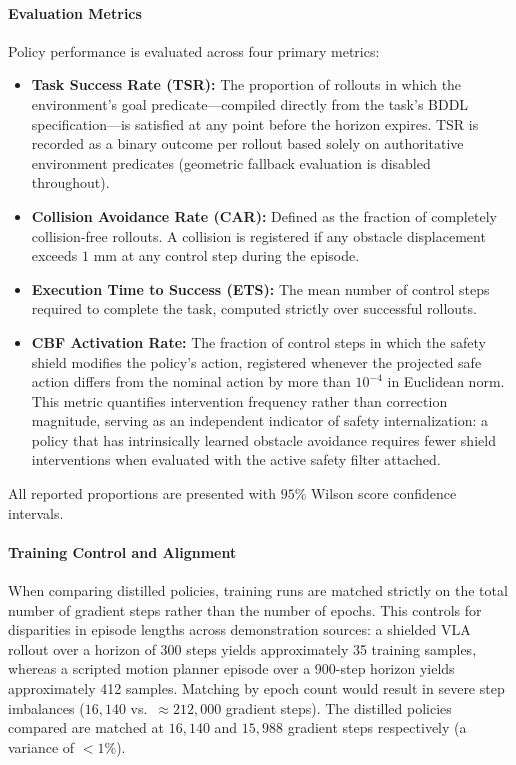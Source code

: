 \documentclass[a4paper,11pt]{report}
\begin{document}
\paragraph{Evaluation Metrics}
Policy performance is evaluated across four primary metrics:
\begin{itemize}
    \item \textbf{Task Success Rate (TSR):} The proportion of rollouts in which the environment's goal predicate—compiled directly from the task's BDDL specification—is satisfied at any point before the horizon expires. TSR is recorded as a binary outcome per rollout based solely on authoritative environment predicates (geometric fallback evaluation is disabled throughout).
    \item \textbf{Collision Avoidance Rate (CAR):} Defined as the fraction of completely collision-free rollouts. A collision is registered if any obstacle displacement exceeds $1\text{ mm}$ at any control step during the episode.
    \item \textbf{Execution Time to Success (ETS):} The mean number of control steps required to complete the task, computed strictly over successful rollouts.
    \item \textbf{CBF Activation Rate:} The fraction of control steps in which the safety shield modifies the policy's action, registered whenever the projected safe action differs from the nominal action by more than $10^{-4}$ in Euclidean norm. This metric quantifies intervention frequency rather than correction magnitude, serving as an independent indicator of safety internalization: a policy that has intrinsically learned obstacle avoidance requires fewer shield interventions when evaluated with the active safety filter attached.
\end{itemize}

All reported proportions are presented with $95\%$ Wilson score confidence intervals.

\paragraph{Training Control and Alignment}
When comparing distilled policies, training runs are matched strictly on the total number of gradient steps rather than the number of epochs. This controls for disparities in episode lengths across demonstration sources: a shielded VLA rollout over a horizon of 300 steps yields approximately 35 training samples, whereas a scripted motion planner episode over a 900-step horizon yields approximately 412 samples. Matching by epoch count would result in severe step imbalances ($16{,}140$ vs.\ $\approx 212{,}000$ gradient steps). The distilled policies compared are matched at $16{,}140$ and $15{,}988$ gradient steps respectively (a variance of $<1\%$).
\end{document}
